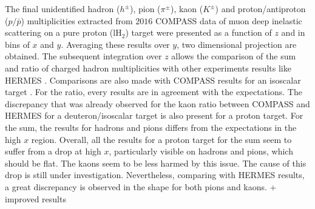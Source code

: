The final unidentified hadron ($h^{\pm}$), pion ($\pi^{\pm}$), kaon ($K^{\pm}$) and proton/antiproton ($p/\bar{p}$) multiplicities extracted from $2016$ COMPASS data of muon deep inelastic scattering on a pure proton (lH$_2$) target were presented as a function of $z$ and in bins of $x$ and $y$. Averaging these results over $y$, two dimensional projection are obtained. The subsequent integration over $z$ allows the comparison of the sum and ratio of charged hadron multiplicities with other experiments results like HERMES \cite{HERMESMult}. Comparisons are also made with COMPASS results for an isoscalar target \cite{COMPASS2006Pi,COMPASS2006K}. For the ratio, every results are in agreement with the expectations. The discrepancy that was already observed for the kaon ratio between COMPASS and HERMES for a deuteron/isoscalar target is also present for a proton target. For the sum, the results for hadrons and pions differs from the expectations in the high $x$ region. Overall, all the results for a proton target for the sum seem to suffer from a drop at high $x$, particularly visible on hadrons and pions, which should be flat. The kaons seem to be less harmed by this issue. The cause of this drop is still under investigation. Nevertheless, comparing with HERMES results, a great discrepancy is observed in the shape for both pions and kaons. + improved results 
